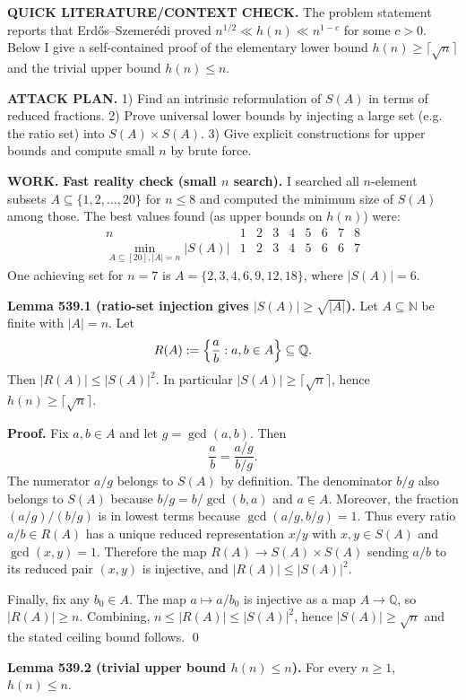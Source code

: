\noindent\textbf{QUICK LITERATURE/CONTEXT CHECK.}
The problem statement reports that Erd\H{o}s--Szemer\'edi proved
$n^{1/2}\ll h(n)\ll n^{1-c}$ for some $c>0$.
Below I give a self-contained proof of the elementary lower bound $h(n)\ge \lceil\sqrt n\rceil$ and the trivial upper bound $h(n)\le n$.

\noindent\textbf{ATTACK PLAN.}
1) Find an intrinsic reformulation of $S(A)$ in terms of reduced fractions.
2) Prove universal lower bounds by injecting a large set (e.g. the ratio set) into $S(A)\times S(A)$.
3) Give explicit constructions for upper bounds and compute small $n$ by brute force.

\noindent\textbf{WORK.}
\textbf{Fast reality check (small $n$ search).}
I searched all $n$-element subsets $A\subseteq\{1,2,\dots,20\}$ for $n\le 8$ and computed the minimum size of $S(A)$ among those.
The best values found (as upper bounds on $h(n)$) were:
\[
\begin{array}{c|cccccccc}
 n&1&2&3&4&5&6&7&8\\\hline
 \min_{A\subseteq[20],|A|=n} |S(A)| & 1&2&3&4&5&6&6&7
\end{array}
\]
One achieving set for $n=7$ is $A=\{2,3,4,6,9,12,18\}$, where $|S(A)|=6$.

\medskip
\textbf{Lemma 539.1 (ratio-set injection gives $|S(A)|\ge \sqrt{|A|}$).}
Let $A\subseteq\mathbb N$ be finite with $|A|=n$.
Let
\[
R(A):=\Bigl\{\frac{a}{b}: a,b\in A\Bigr\}\subseteq\mathbb Q.
\]
Then $|R(A)|\le |S(A)|^2$.
In particular $|S(A)|\ge \lceil\sqrt n\rceil$, hence $h(n)\ge \lceil\sqrt n\rceil$.

\textbf{Proof.}
Fix $a,b\in A$ and let $g=\gcd(a,b)$. Then
\[
\frac{a}{b}=\frac{a/g}{b/g}.
\]
The numerator $a/g$ belongs to $S(A)$ by definition.
The denominator $b/g$ also belongs to $S(A)$ because
\(
 b/g = b/\gcd(b,a)
\)
and $a\in A$.
Moreover, the fraction $(a/g)/(b/g)$ is in lowest terms because $\gcd(a/g,b/g)=1$.
Thus every ratio $a/b\in R(A)$ has a unique reduced representation $x/y$ with $x,y\in S(A)$ and $\gcd(x,y)=1$.
Therefore the map $R(A)\to S(A)\times S(A)$ sending $a/b$ to its reduced pair $(x,y)$ is injective, and
$|R(A)|\le |S(A)|^2$.

Finally, fix any $b_0\in A$. The map $a\mapsto a/b_0$ is injective as a map $A\to\mathbb Q$, so $|R(A)|\ge n$.
Combining, $n\le |R(A)|\le |S(A)|^2$, hence $|S(A)|\ge \sqrt n$ and the stated ceiling bound follows. \qed

\medskip
\textbf{Lemma 539.2 (trivial upper bound $h(n)\le n$).}
For every $n\ge 1$, $h(n)\le n$.

